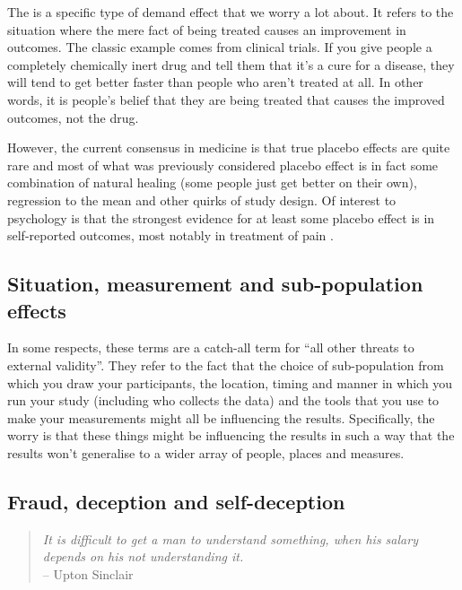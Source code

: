 The  is a specific type of demand effect that we worry a lot about. It refers to the situation where the mere fact of being treated causes an improvement in outcomes. The classic example comes from clinical trials. If you give people a completely chemically inert drug and tell them that it's a cure for a disease, they will tend to get better faster than people who aren't treated at all. In other words, it is people's belief that they are being treated that causes the improved outcomes, not the drug.

However, the current consensus in medicine is that true placebo effects are quite rare and most of what was previously considered placebo effect is in fact some combination of natural healing (some people just get better on their own), regression to the mean and other quirks of study design. Of interest to psychology is that the strongest evidence for at least some placebo effect is in self-reported outcomes, most notably in treatment of pain \parencite{hrobjartsson2010}.

\subsection{Situation, measurement and sub-population effects}
 
In some respects, these terms are a catch-all term for ``all other threats to external validity''. They refer to the fact that the choice of sub-population from which you draw your participants, the location, timing and manner in which you run your study (including who collects the data) and the tools that you use to make your measurements might all be influencing the results. Specifically, the worry is that these things might be influencing the results in such a way that the results won't generalise to a wider array of people, places and measures. 
 
\subsection{Fraud, deception and self-deception} 

\begin{quote}
{\it It is difficult to get a man to understand something, when his salary depends on his not understanding it.} \\
\hspace*{2cm} -- Upton Sinclair
\end{quote}

